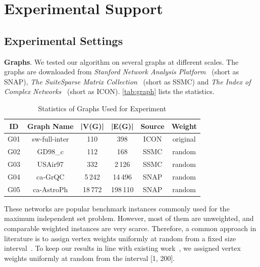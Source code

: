 \documentclass[sigconf, nonacm]{acmart}
\begin{document}
\section{Experimental Support}

\subsection{Experimental Settings}

\noindent\textbf{Graphs}. We tested our algorithm on several graphs at different scales. The graphs are downloaded from \emph{Stanford Network Analysis Platform}~\cite{snapnets} (short as SNAP), \emph{The SuiteSparse Matrix Collection}~\cite{2011The} (short as SSMC) and \emph{The Index of Complex Networks}~\cite{iconnets} (short as ICON). \autoref{tab:graph} lists the statistics.

\begin{table}[tbp]%
  \caption{Statistics of Graphs Used for Experiment}
  \label{tab:graph}
  \begin{tabular}{cccccc}
    \toprule
    \textbf{ID} & \textbf{Graph Name} & \textbf{|V(G)|} & \textbf{|E(G)|} & \textbf{Source} & \textbf{Weight}\\
    \midrule
    G01 & sw-full-inter & 110 & 398 & ICON & original\\
    G02 & GD98\_c & 112 & 168 & SSMC & random\\
    G03 & USAir97 & 332 & 2\,126 & SSMC & random\\
    G04 & ca-GrQC & 5\,242 & 14\,496 & SNAP & random\\
    G05 & ca-AstroPh & 18\,772 & 198\,110 & SNAP & random\\
  \bottomrule
\end{tabular}
\end{table}

These networks are popular benchmark instances commonly used for the maximum independent set problem. However, most of them are unweighted, and comparable weighted instances are very scarce. Therefore, a common approach in literature is to assign vertex weights uniformly at random from a fixed size interval~\cite{2018Improving,2017An}. To keep our results in line with existing work~\cite{Lamm0SWZ19}, we assigned vertex weights uniformly at random from the interval [1, 200].
\end{document}
